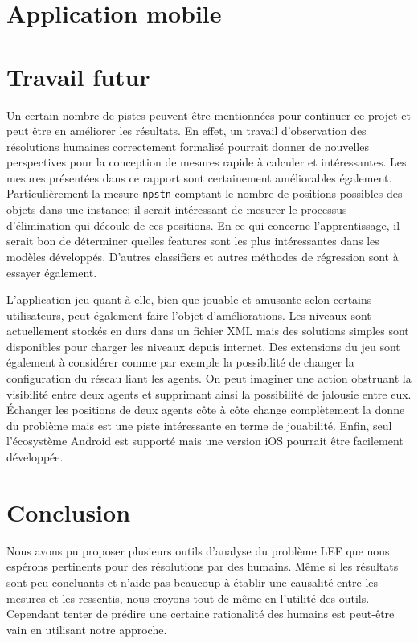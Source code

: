\documentclass[a4paper, 11pt, titlepage]{article}
\begin{document}
	\section{Application mobile}
	    \label{app}
	    
	    
	\newpage
	\section{Travail futur}
    Un certain nombre de pistes peuvent être mentionnées pour continuer ce projet et peut être en améliorer les résultats. En effet, un travail d'observation des résolutions humaines correctement formalisé pourrait donner de nouvelles perspectives pour la conception de mesures rapide à calculer et intéressantes. Les mesures présentées dans ce rapport sont certainement améliorables également. Particulièrement la mesure \texttt{npstn} comptant le nombre de positions possibles des objets dans une instance; il serait intéressant de mesurer le processus d'élimination qui découle de ces positions. En ce qui concerne l'apprentissage, il serait bon de déterminer quelles features sont les plus intéressantes dans les modèles développés. D'autres classifiers et autres méthodes de régression sont à essayer également.
    
	L'application jeu quant à elle, bien que jouable et amusante selon certains utilisateurs, peut également faire l'objet d'améliorations. Les niveaux sont actuellement stockés en durs dans un fichier XML mais des solutions simples sont disponibles pour charger les niveaux depuis internet. Des extensions du jeu sont également à considérer comme par exemple la possibilité de changer la configuration du réseau liant les agents. On peut imaginer une action obstruant la visibilité entre deux agents et supprimant ainsi la possibilité de jalousie entre eux. Échanger les positions de deux agents côte à côte change complètement la donne du problème mais est une piste intéressante en terme de jouabilité. Enfin, seul l'écosystème Android est supporté mais une version iOS pourrait être facilement développée.
	
	\section{Conclusion}
	
	Nous avons pu proposer plusieurs outils d'analyse du problème LEF que nous espérons pertinents pour des résolutions  par des humains. Même si les résultats sont peu concluants et n'aide pas beaucoup à établir une causalité entre les mesures et les ressentis, nous croyons tout de même en l'utilité des outils. Cependant tenter de prédire une certaine rationalité des humains est peut-être vain en utilisant notre approche.
	
\end{document}
